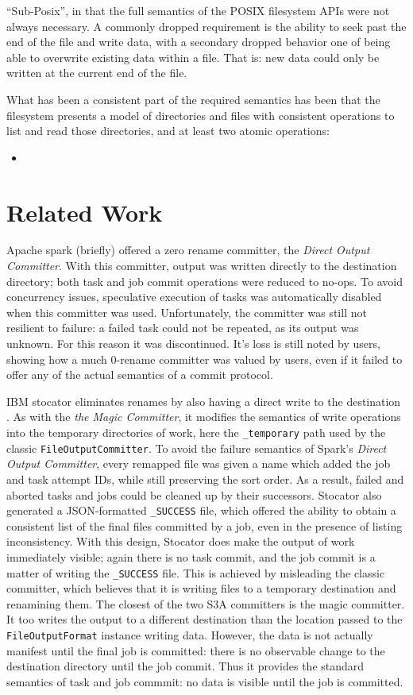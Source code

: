 ``Sub-Posix'', in that the full semantics of the POSIX filesystem APIs were not always necessary. A commonly dropped requirement is the ability to seek past the end of the file and write data, with a secondary dropped behavior one of being able to overwrite existing data within a file. That is: new data could only be written at the current end of the file. 

What has been a consistent part of the required semantics has been that the filesystem presents a model of directories and files with consistent operations to list and read those directories, and at least two atomic operations: 
\begin{itemize}
  \item{}
\end{itemize}

\section{Related Work}

Apache spark (briefly) offered a zero rename committer, the \emph{Direct Output Committer}. With this committer, output was written directly to the destination directory; both task and job commit operations were reduced to no-ops. To avoid concurrency issues, speculative execution of tasks was automatically disabled when this committer was used. Unfortunately, the committer was still not resilient to failure: a failed task could not be repeated, as its output was unknown. For this reason it was discontinued. It's loss is still noted by users, showing how a much 0-rename committer was valued by users, even if it failed to offer any of the actual semantics of a commit protocol.

IBM stocator eliminates renames by also having a direct write to the destination  \cite{DBLP:journals/corr/abs-1709-01812}. As with the \emph{the Magic Committer}, it modifies the semantics of write operations into the temporary directories of work, here the \texttt{_temporary} path used by the classic \texttt{FileOutputCommitter}.
To avoid the failure semantics of Spark's \emph{Direct Output Committer}, every remapped file was given a name which added the job and task attempt IDs, while still preserving the sort order. As a result, failed and aborted tasks and jobs could be cleaned up by their successors. Stocator also generated a JSON-formatted \texttt{_SUCCESS} file, which offered the ability to obtain a consistent list of the final files committed by a job, even in the presence of listing inconsistency. With this design, Stocator does make the output of work immediately visible; again there is no task commit, and the job commit is a matter of writing the \texttt{_SUCCESS} file. This is achieved by misleading the classic committer, which believes that it is writing files to a temporary destination and renamining them. The closest of the two S3A committers is the magic committer. It too writes the output to a different destination than the location passed to the \texttt{FileOutputFormat} instance writing data. However, the data is not actually manifest until the final job is committed: there is no observable change to the destination directory until the job commit. Thus it provides the standard semantics of task and job commmit: no data is visible until the job is committed.